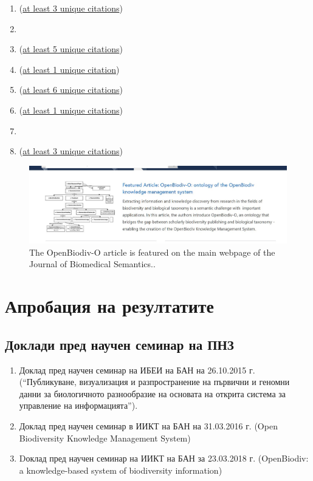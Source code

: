 \begingroup
{}
\setcounter{count}{99}
%

\begin{enumerate}
\item {} (\ul{at least 3 unique citations})
\item {}
\item {} (\ul{at least 5 unique citations})
\item {} (\ul{at least 1 unique citation})
\item {} (\ul{at least 6 unique citations})
\item {} (\ul{at least 1 unique citations})
\item {} 
\item {} (\ul{at least 3 unique citations})
\end{enumerate}
\endgroup

\begin{figure}
\centering
\includegraphics[width=\textwidth]{Figures/JBS-featured.jpg}
\decoRule
\caption{The OpenBiodiv-O article is featured on the main webpage of the Journal of Biomedical Semantics..}
\label{fig:jbs-featured}
\end{figure}

\section*{Апробация на резултатите}

\subsection*{Доклади пред научен семинар на ПНЗ}

\begin{enumerate}
    \item Доклад пред научен семинар на ИБЕИ на БАН на 26.10.2015 г. (“Публикуване, визуализация и разпространение на първични и геномни данни за биологичното разнообразие на основата на открита система за управление на информацията”).
    \item Доклад пред научен семинар в ИИКТ на БАН на 31.03.2016 г. (Open Biodiversity Knowledge Management System)
    \item Dоклад пред научен семинар на ИИКТ на БАН за 23.03.2018 г. (OpenBiodiv: a knowledge-based system of biodiversity information)
\end{enumerate}

